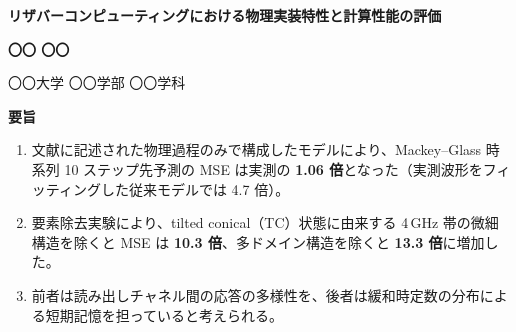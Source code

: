 \documentclass{article}
\newcommand\rTC{10.3}     %
\newcommand\rMD{13.3}     %
\newcommand\gapfull{1.06}   %
\newcommand\gapold{4.7}
\newcommand\subheadfont{\fontsize{24}{30}\selectfont\bfseries}
\newcommand\key[1]{\textbf{\color{cAcc}#1}}
\newlength\gap   \setlength\gap{11mm}
\newcommand\vgap{\par\vspace{7mm}}
\begin{document}

\begin{tcolorbox}[enhanced, colback=cMain, colframe=cMain, arc=4mm,
  left=18mm, right=14mm, top=9mm, bottom=9mm, coltext=white]
\begin{minipage}[c]{\dimexpr\linewidth-150mm}
  {\fontsize{56}{67}\selectfont\bfseries リザバーコンピューティングにおける物理実装特性と計算性能の評価\par}
\end{minipage}\hfill
\begin{minipage}[c]{140mm}\raggedleft
  {\fontsize{30}{38}\selectfont\bfseries 〇〇 〇〇\par}
  {\fontsize{22}{30}\selectfont 〇〇大学 〇〇学部 〇〇学科\par}
  \vspace{3mm}
\end{minipage}
\end{tcolorbox}
\vgap

\begin{tcolorbox}[enhanced, colback=cLight, colframe=cMain, boxrule=1.5pt, arc=4mm,
  left=12mm, right=12mm, top=6mm, bottom=6mm]
{\subheadfont\color{cMain}要旨\par}\vspace{2mm}
\begin{enumerate}
  \item 文献に記述された物理過程のみで構成したモデルにより、Mackey–Glass 時系列 10 ステップ先予測の MSE は実測の \key{\gapfull{} 倍}となった（実測波形をフィッティングした従来モデルでは \gapold{} 倍）。
  \item 要素除去実験により、tilted conical（TC）状態に由来する 4\,GHz 帯の微細構造を除くと MSE は \key{\rTC{} 倍}、多ドメイン構造を除くと \key{\rMD{} 倍}に増加した。
  \item 前者は読み出しチャネル間の応答の多様性を、後者は緩和時定数の分布による短期記憶を担っていると考えられる。
\end{enumerate}
\end{tcolorbox}
\vgap
\end{document}
